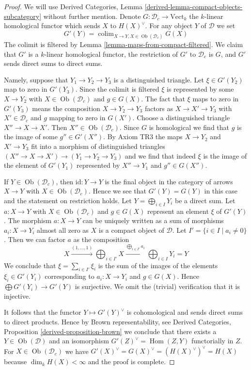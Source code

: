 \documentclass{stacks-project}
\theoremstyle{plain}
\theoremstyle{definition}
\theoremstyle{remark}
\numberwithin{equation}{subsection}
\def\colim{\mathop{\mathrm{colim}}\nolimits}
\def\Hom{\mathop{\mathrm{Hom}}\nolimits}
\def\Ob{\mathop{\mathrm{Ob}}\nolimits}
\begin{document}
\begin{proof}
We will use Derived Categories, Lemma
\ref{derived-lemma-compact-objects-subcategory} without further mention.
Denote $G : \mathcal{D}_c \to \text{Vect}_k$ the $k$-linear homological
functor which sends $X$ to $H(X)^\vee$. For any object $Y$ of $\mathcal{D}$
we set
$$
G'(Y) = \colim_{X \to Y, X \in \Ob(\mathcal{D}_c)} G(X)
$$
The colimit is filtered by Lemma \ref{lemma-maps-from-compact-filtered}.
We claim that $G'$ is a $k$-linear homological functor,
the restriction of $G'$ to $\mathcal{D}_c$ is $G$, and $G'$
sends direct sums to direct sums.

\medskip\noindent
Namely, suppose that $Y_1 \to Y_2 \to Y_3$ is a distinguished triangle.
Let $\xi \in G'(Y_2)$ map to zero in $G'(Y_3)$. Since the colimit is
filtered $\xi$ is represented by some $X \to Y_2$ with
$X \in \Ob(\mathcal{D}_c)$ and $g \in G(X)$.
The fact that $\xi$ maps to zero in $G'(Y_3)$ means the composition
$X \to Y_2 \to Y_3$ factors as $X \to X' \to Y_3$ with $X' \in \mathcal{D}_c$
and $g$ mapping to zero in $G(X')$. Choose a distinguished
triangle $X'' \to X \to X'$. Then $X'' \in \Ob(\mathcal{D}_c)$.
Since $G$ is homological we find that $g$ is the image of some
$g'' \in G'(X'')$. By Axiom TR3 the maps $X \to Y_2$ and $X' \to Y_3$ fit into
a morphism of distinguished triangles
$(X'' \to X \to X') \to (Y_1 \to Y_2 \to Y_3)$
and we find that indeed $\xi$ is the image of the
element of $G'(Y_1)$ represented by $X'' \to Y_1$ and $g'' \in G(X'')$.

\medskip\noindent
If $Y \in \Ob(\mathcal{D}_c)$, then $\text{id} : Y \to Y$ is the final
object in the category of arrows $X \to Y$ with $X \in \Ob(\mathcal{D}_c)$.
Hence we see that $G'(Y) = G(Y)$ in this case and the
statement on restriction holds. Let $Y = \bigoplus_{i \in I} Y_i$
be a direct sum. Let $a : X \to Y$ with $X \in \Ob(\mathcal{D}_c)$
and $g \in G(X)$ represent an element $\xi$ of $G'(Y)$.
The morphism $a : X \to Y$ can be uniquely written as a sum of morphisms
$a_i : X \to Y_i$ almost all zero as $X$ is a compact object of $\mathcal{D}$.
Let $I' = \{i \in I \mid a_i \not = 0\}$. Then we can factor
$a$ as the composition
$$
X \xrightarrow{(1, \ldots, 1)}
\bigoplus\nolimits_{i \in I'} X
\xrightarrow{\bigoplus_{i \in I'} a_i}
\bigoplus\nolimits_{i \in I} Y_i = Y
$$
We conclude that $\xi = \sum_{i \in I'} \xi_i$
is the sum of the images of the elements
$\xi_i \in G'(Y_i)$ corresponding to $a_i : X \to Y_i$
and $g \in G(X)$. Hence $\bigoplus G'(Y_i) \to G'(Y)$
is surjective. We omit the (trivial) verification that it is injective.

\medskip\noindent
It follows that the functor $Y \mapsto G'(Y)^\vee$ is cohomological
and sends direct sums to direct products. Hence by Brown representability,
see Derived Categories, Proposition \ref{derived-proposition-brown}
we conclude that there exists a $Y \in \Ob(\mathcal{D})$
and an isomorphism
$G'(Z)^\vee = \Hom(Z, Y)$ functorially in $Z$.
For $X \in \Ob(\mathcal{D}_c)$ we have
$G'(X)^\vee = G(X)^\vee = (H(X)^\vee)^\vee = H(X)$
because $\dim_k H(X) < \infty$ and the proof is complete.
\end{proof}
\end{document}
